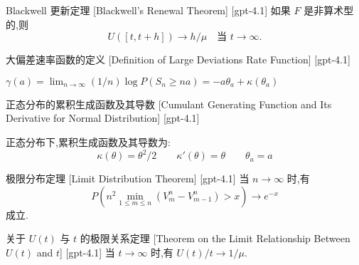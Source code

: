 \documentclass[UTF8]{ctexart}
\begin{document}
    
    
    \begin{thm}
        {Blackwell 更新定理}
        [Blackwell's Renewal Theorem]
        [gpt-4.1]
        如果 $F$ 是非算术型的,则
\[
U([t, t+h]) \to h/\mu \quad \text{当 } t \to \infty.
\]

    \end{thm}
    
    
    
    \begin{dfn}
        {大偏差速率函数的定义}
        [Definition of Large Deviations Rate Function]
        [gpt-4.1]
        
$\gamma(a) = \displaystyle \lim_{n \to \infty} (1/n) \log P(S_n \geq n a) = -a \theta_a + \kappa(\theta_a)$

    \end{dfn}
    
    
    
    \begin{dfn}
        {正态分布的累积生成函数及其导数}
        [Cumulant Generating Function and Its Derivative for Normal Distribution]
        [gpt-4.1]
        
正态分布下,累积生成函数及其导数为:
\[
\kappa(\theta) = \theta^2 / 2 \qquad \kappa'(\theta) = \theta \qquad \theta_a = a
\]

    \end{dfn}
    
    
    
    \begin{thm}
        {极限分布定理}
        [Limit Distribution Theorem]
        [gpt-4.1]
        当 $n \to \infty$ 时,有
\[
P\left(n^2 \operatorname*{min}_{1 \leq m \leq n} (V_m^n - V_{m-1}^n) > x\right) \to e^{-x}
\]
成立.
    \end{thm}
    
    
    
    \begin{thm}
        {关于 $U(t)$ 与 $t$ 的极限关系定理}
        [Theorem on the Limit Relationship Between $U(t)$ and $t$]
        [gpt-4.1]
        当 $t \to \infty$ 时,有 $U(t) / t \to 1 / \mu$.
    \end{thm}
    
    
    
\end{document}
